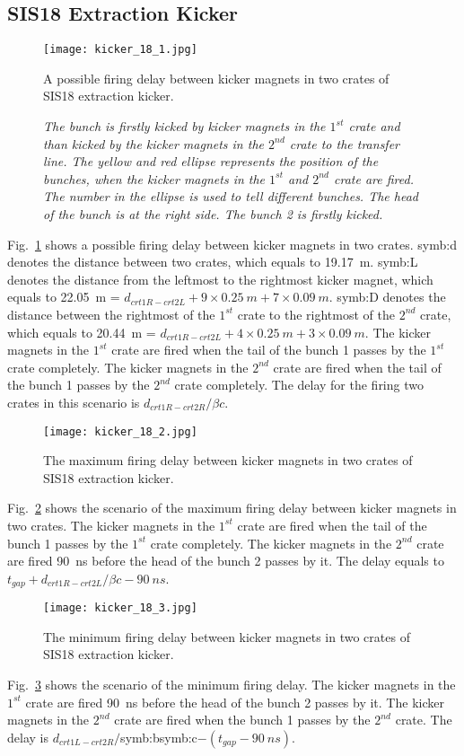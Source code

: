 \subsection{SIS18 Extraction Kicker}
\begin{figure}[H]
   \centering   
   \texttt{[image: kicker\_18\_1.jpg]}
   \caption{A possible firing delay between kicker magnets in two crates of SIS18 extraction kicker.}
	\caption*{\textsl{\small{The bunch is firstly kicked by kicker magnets in the $1^{st}$ crate and than kicked by the kicker magnets in the $2^{nd}$ crate to the transfer line. The yellow and red ellipse represents the position of the bunches, when the kicker magnets in the $1^{st}$ and $2^{nd}$ crate are fired. The number in the ellipse is used to tell different bunches. The head of the bunch is at the right side. The bunch 2 is firstly kicked. }}}
   \label{kicker_18_1}
\end{figure}
Fig.~\ref{kicker_18_1} shows a possible firing delay between kicker magnets in two crates. \gls{symb:d} denotes the distance between two crates, which equals to \SI{19.17}{m}. \gls{symb:L} denotes the distance from the leftmost to the rightmost kicker magnet, which equals to \SI{22.05}{m} = $d_\mathit{crt1R-crt2L} + 9\times \SI{0.25}{m} + 7\times \SI{0.09}{m}$. \gls{symb:D} denotes the distance between the rightmost of the $1^{st}$ crate to the rightmost of the $2^{nd}$ crate, which equals to \SI{20.44}{m} = $d_\mathit{crt1R-crt2L} + 4\times \SI{0.25}{m} + 3\times \SI{0.09}{m}$. The kicker magnets in the $1^{st}$ crate are fired when the tail of the bunch 1 passes by the $1^{st}$ crate completely. The kicker magnets in the $2^{nd}$ crate are fired when the tail of the bunch 1 passes by the $2^{nd}$ crate completely. The delay for the firing two crates in this scenario is $d_\mathit{crt1R-crt2R}/\beta c$. 
\begin{figure}[H]
   \centering   
   \texttt{[image: kicker\_18\_2.jpg]}
   \caption{The maximum firing delay between kicker magnets in two crates of SIS18 extraction kicker.}
   \label{kicker_18_2}
\end{figure}
Fig.~\ref{kicker_18_2} shows the scenario of the maximum firing delay between kicker magnets in two crates. The kicker magnets in the $1^{st}$ crate are fired when the tail of the bunch 1 passes by the $1^{st}$ crate completely. The kicker magnets in the $2^{nd}$ crate are fired \SI{90}{ns} before the head of the bunch 2 passes by it. The delay equals to $t_\mathit{gap}+d_\mathit{crt1R-crt2L}/\beta c-\SI{90}{ns}$.
\begin{figure}[H]
   \centering   
   \texttt{[image: kicker\_18\_3.jpg]}
   \caption{The minimum firing delay between kicker magnets in two crates of SIS18 extraction kicker.}
   \label{kicker_18_3}
\end{figure}
Fig.~\ref{kicker_18_3} shows the scenario of the minimum firing delay. The kicker magnets in the $1^{st}$ crate are fired \SI{90}{ns} before the head of the bunch 2 passes by it. The kicker magnets in the $2^{nd}$ crate are fired when the bunch 1 passes by the $2^{nd}$ crate. The delay is $d_\mathit{crt1L-crt2R}/$\gls{symb:b}\gls{symb:c}$-(t_\mathit{gap}-\SI{90}{ns})$.

